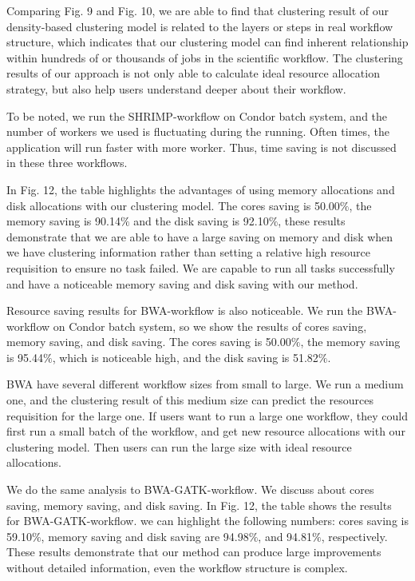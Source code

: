 \documentclass[conference]{IEEEtran}
\begin{document}
Comparing Fig. 9 and Fig. 10, we are able to find that clustering result of our density-based clustering model is related to the layers or steps in real workflow structure, which indicates that our clustering model can find inherent relationship within hundreds of or thousands of jobs in the scientific workflow. The clustering results of our approach is not only able to calculate ideal resource allocation strategy, but also help users understand deeper about their workflow.

To be noted, we run the SHRIMP-workflow on Condor batch system, and the number of workers we used is fluctuating during the running. Often times, the application will run faster with more worker. Thus, time saving is not discussed in these three workflows.

In Fig. 12, the table highlights the advantages of using memory allocations and disk allocations with our clustering model. The cores saving is 50.00$\%$, the memory saving is 90.14$\%$ and the disk saving is 92.10$\%$, these results demonstrate that we are able to have a large saving on memory and disk when we have clustering information rather than setting a relative high resource requisition to ensure no task failed. We are capable to run all tasks successfully and have a noticeable memory saving and disk saving with our method.

Resource saving results for BWA-workflow is also noticeable. We run the BWA-workflow on Condor batch system, so we show the results of cores saving, memory saving, and disk saving. The cores saving is 50.00$\%$, the memory saving is 95.44$\%$, which is noticeable high, and the disk saving is 51.82$\%$. 

BWA have several different workflow sizes from small to large. We run a medium one, and the clustering result of this medium size can predict the resources requisition for the large one. If users want to run a large one workflow, they could first run a small batch of the workflow, and get new resource allocations with our clustering model. Then users can run the large size with ideal resource allocations.


        We do the same analysis to BWA-GATK-workflow. We discuss about cores saving, memory saving, and disk saving. In Fig. 12, the table shows the results for BWA-GATK-workflow. we can highlight the following numbers: cores saving is 59.10$\%$, memory saving and disk saving are 94.98$\%$, and 94.81$\%$, respectively. These results demonstrate that our method can produce large improvements without detailed information, even the workflow structure is complex.
\end{document}
